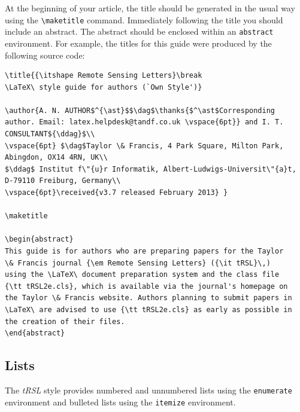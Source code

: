 \documentclass[]{tRSL2e}
\begin{document}
At the beginning of your article, the title should be generated in the usual way using the {\verb"\maketitle"}
command. Immediately following the title you should include an abstract. The abstract should be enclosed within
an {\tt abstract} environment. For example, the titles for this guide were produced by the following source code:
%
\begin{verbatim}
\title{{\itshape Remote Sensing Letters}\break
\LaTeX\ style guide for authors (`Own Style')}

\author{A. N. AUTHOR$^{\ast}$$\dag$\thanks{$^\ast$Corresponding
author. Email: latex.helpdesk@tandf.co.uk \vspace{6pt}} and I. T.
CONSULTANT${\ddag}$\\
\vspace{6pt} $\dag$Taylor \& Francis, 4 Park Square, Milton Park,
Abingdon, OX14 4RN, UK\\
$\ddag$ Institut f\"{u}r Informatik, Albert-Ludwigs-Universit\"{a}t,
D-79110 Freiburg, Germany\\
\vspace{6pt}\received{v3.7 released February 2013} }

\maketitle

\begin{abstract}
This guide is for authors who are preparing papers for the Taylor
\& Francis journal {\em Remote Sensing Letters} ({\it tRSL}\,)
using the \LaTeX\ document preparation system and the class file
{\tt tRSL2e.cls}, which is available via the journal's homepage on
the Taylor \& Francis website. Authors planning to submit papers in
\LaTeX\ are advised to use {\tt tRSL2e.cls} as early as possible in
the creation of their files.
\end{abstract}
\end{verbatim}


\subsection{Lists}

The {\it tRSL} style provides numbered and unnumbered lists using the {\tt enumerate} environment and bulleted
lists  using the {\tt itemize} environment.
\end{document}
